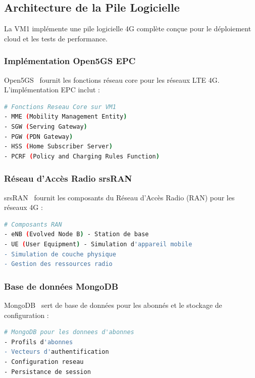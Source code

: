 \documentclass[12pt,a4paper]{report}
\begin{document}
\subsection{Architecture de la Pile Logicielle}

La VM1 implémente une pile logicielle 4G complète conçue pour le déploiement cloud et les tests de performance.

\subsubsection{Implémentation Open5GS EPC}

Open5GS~\cite{open5gs-docs} fournit les fonctions réseau core pour les réseaux LTE 4G. L'implémentation EPC inclut :

\begin{lstlisting}[caption=Composants Core Open5GS 4G, language=bash]
# Fonctions Reseau Core sur VM1
- MME (Mobility Management Entity)
- SGW (Serving Gateway)
- PGW (PDN Gateway)
- HSS (Home Subscriber Server)
- PCRF (Policy and Charging Rules Function)
\end{lstlisting}

\subsubsection{Réseau d'Accès Radio srsRAN}

srsRAN~\cite{srsran-docs} fournit les composants du Réseau d'Accès Radio (RAN) pour les réseaux 4G :

\begin{lstlisting}[caption=Composants srsRAN, language=bash]
# Composants RAN
- eNB (Evolved Node B) - Station de base
- UE (User Equipment) - Simulation d'appareil mobile
- Simulation de couche physique
- Gestion des ressources radio
\end{lstlisting}

\subsubsection{Base de données MongoDB}

MongoDB~\cite{mongodb-docs} sert de base de données pour les abonnés et le stockage de configuration :

\begin{lstlisting}[caption=Configuration MongoDB, language=bash]
# MongoDB pour les donnees d'abonnes
- Profils d'abonnes
- Vecteurs d'authentification
- Configuration reseau
- Persistance de session
\end{lstlisting}
\end{document}
